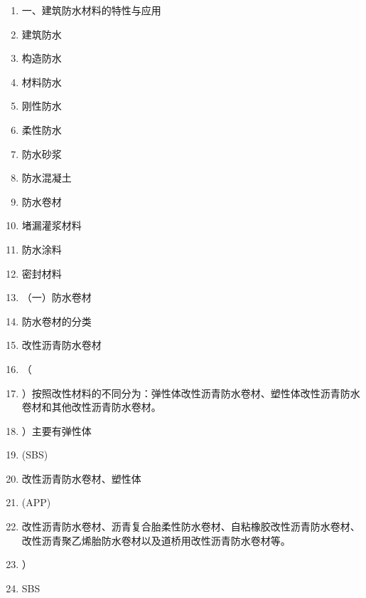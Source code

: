 \documentclass[UTF8,fontset=fandol,11pt]{ctexart}
\begin{document}
\begin{enumerate}[label=\arabic*.]

\item 一、建筑防水材料的特性与应用

\item 建筑防水

\item 构造防水

\item 材料防水

\item 刚性防水

\item 柔性防水

\item 防水砂浆

\item 防水混凝土

\item 防水卷材

\item 堵漏灌浆材料

\item 防水涂料

\item 密封材料

\item （一）防水卷材

\item 防水卷材的分类

\item 改性沥青防水卷材

\item （

\item ）按照改性材料的不同分为：弹性体改性沥青防水卷材、塑性体改性沥青防水卷材和其他改性沥青防水卷材。

\item ）主要有弹性体

\item (SBS)

\item 改性沥青防水卷材、塑性体

\item (APP)

\item 改性沥青防水卷材、沥青复合胎柔性防水卷材、自粘橡胶改性沥青防水卷材、改性沥青聚乙烯胎防水卷材以及道桥用改性沥青防水卷材等。

\item ）

\item SBS

\end{enumerate}
\end{document}
